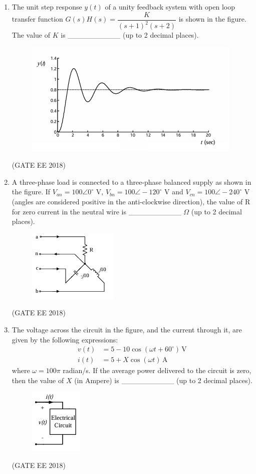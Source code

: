 \documentclass[journal,12pt,onecolumn]{IEEEtran}
\theoremstyle{remark}
\begin{document}
\begin{enumerate}
\item The unit step response $y(t)$ of a unity feedback system with open loop transfer function $G(s)H(s) = \dfrac{K}{(s+1)^2(s+2)}$ is shown in the figure. The value of $K$ is \_\_\_\_\_\_\_\_\_\_ (up to 2 decimal places).
\begin{figure}[H]
    \centering
    \includegraphics[]{figs/Q.46.png}
    \caption{}
    \label{fig:19}
\end{figure}
\hfill{(GATE EE 2018)}

\item A three-phase load is connected to a three-phase balanced supply as shown in the figure. If $V_{an} = 100\angle0^\circ$ V, $V_{bn} = 100\angle-120^\circ$ V and $V_{cn} = 100\angle-240^\circ$ V (angles are considered positive in the anti-clockwise direction), the value of R for zero current in the neutral wire is \_\_\_\_\_\_\_\_\_\_ $\Omega$ (up to 2 decimal places).
\begin{figure}[H]
    \centering
    \includegraphics[]{figs/Q.47.png}
    \caption{}
    \label{fig:20}
\end{figure}
\hfill{(GATE EE 2018)}

\item The voltage across the circuit in the figure, and the current through it, are given by the following expressions:
\begin{align*}
v(t) &= 5 - 10 \cos(\omega t + 60^\circ) \, \text{V} \\
i(t) &= 5 + X \cos(\omega t) \, \text{A}
\end{align*}
where $\omega = 100\pi$ radian/s. If the average power delivered to the circuit is zero, then the value of $X$ (in Ampere) is \_\_\_\_\_\_\_\_\_\_ (up to 2 decimal places).
\begin{figure}[H]
    \centering
    \includegraphics[]{figs/Q.48.png}
    \caption{}
    \label{fig:21}
\end{figure}
\hfill{(GATE EE 2018)}


\end{enumerate}
\end{document}
